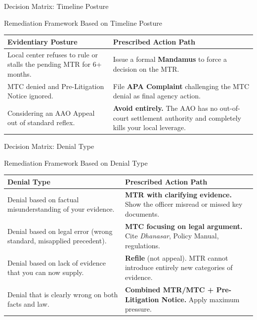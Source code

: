 \documentclass[11pt]{beamer}
\begin{document}
	\begin{frame}{Decision Matrix: Timeline Posture}
		\scriptsize
		\begin{block}{Remediation Framework Based on Timeline Posture}
			\centering
			\begin{tabular}{|p{4cm}|p{6.5cm}|}
				\hline
				\textbf{Evidentiary Posture} & \textbf{Prescribed Action Path} \\
				\hline
				Local center refuses to rule or stalls the pending MTR for 6+ months. & Issue a formal \textbf{Mandamus} to force a decision on the MTR. \\
				\hline
				MTC denied and Pre-Litigation Notice ignored. & File \textbf{APA Complaint} challenging the MTC denial as final agency action. \\
				\hline
				Considering an AAO Appeal out of standard reflex. & \textbf{Avoid entirely.} The AAO has no out-of-court settlement authority and completely kills your local leverage. \\
				\hline
			\end{tabular}
		\end{block}
	\end{frame}
	
	\begin{frame}{Decision Matrix: Denial Type}
		\scriptsize
		\begin{block}{Remediation Framework Based on Denial Type}
			\centering
			\begin{tabular}{|p{4cm}|p{6.5cm}|}
				\hline
				\textbf{Denial Type} & \textbf{Prescribed Action Path} \\
				\hline
				Denial based on factual misunderstanding of your evidence. & \textbf{MTR with clarifying evidence.} Show the officer misread or missed key documents. \\
				\hline
				Denial based on legal error (wrong standard, misapplied precedent). & \textbf{MTC focusing on legal argument.} Cite \textit{Dhanasar}, Policy Manual, regulations. \\
				\hline
				Denial based on lack of evidence that you can now supply. & \textbf{Refile} (not appeal). MTR cannot introduce entirely new categories of evidence. \\
				\hline
				Denial that is clearly wrong on both facts and law. & \textbf{Combined MTR/MTC + Pre-Litigation Notice.} Apply maximum pressure. \\
				\hline
			\end{tabular}
		\end{block}
	\end{frame}
	
\end{document}
